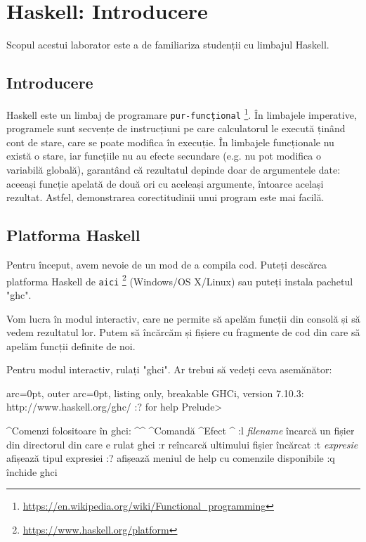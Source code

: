 \section*{ Haskell: Introducere }

Scopul acestui laborator este a de familiariza studenții cu limbajul Haskell.

\subsection*{ Introducere }

Haskell este un limbaj de programare \texttt{pur-funcțional} \footnote{\url{https://en.wikipedia.org/wiki/Functional\_programming}}. În limbajele imperative, programele sunt secvențe de instrucțiuni pe care calculatorul le execută ținând cont de stare, care se poate modifica în execuție. În limbajele funcționale nu există o stare, iar funcțiile nu au efecte secundare (e.g. nu pot modifica o variabilă globală), garantând că rezultatul depinde doar de argumentele date: aceeași funcție apelată de două ori cu aceleași argumente, întoarce același rezultat. Astfel, demonstrarea corectitudinii unui program este mai facilă.

\subsection*{ Platforma Haskell }

Pentru început, avem nevoie de un mod de a compila cod. Puteți descărca platforma Haskell de \texttt{aici} \footnote{\url{https://www.haskell.org/platform}} (Windows/OS X/Linux) sau puteți instala pachetul "ghc".

Vom lucra în modul interactiv, care ne permite să apelăm funcții din consolă și să vedem rezultatul lor. Putem să încărcăm și fișiere cu fragmente de cod din care să apelăm funcții definite de noi. 

Pentru modul interactiv, rulați "ghci". Ar trebui să vedeți ceva asemănător:


\begin{tcblisting}{ arc=0pt, outer arc=0pt, listing only, breakable}
GHCi, version 7.10.3: http://www.haskell.org/ghc/  :? for help
Prelude> 

\end{tcblisting}


\textasciicircum  Comenzi folositoare în ghci: \textasciicircum \textasciicircum 
\textasciicircum  Comandă \textasciicircum  Efect \textasciicircum 
\textbar:l \textit{filename} \textbar încarcă un fișier din directorul din care e rulat ghci \textbar
\textbar:r \textbar reîncarcă ultimului fișier încărcat \textbar
\textbar:t \textit{expresie} \textbar afișează tipul expresiei \textbar
\textbar:? \textbar afișează meniul de help cu comenzile disponibile \textbar
\textbar:q \textbar închide ghci \textbar

